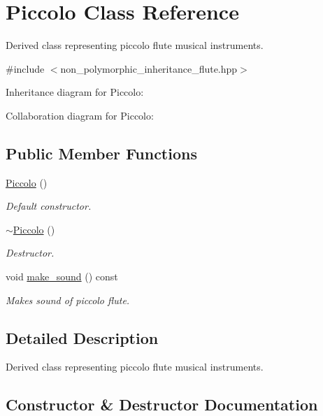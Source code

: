 \hypertarget{classPiccolo}{}\section{Piccolo Class Reference}
\label{classPiccolo}


Derived class representing piccolo flute musical instruments.  




{\ttfamily \#include $<$non\+\_\+polymorphic\+\_\+inheritance\+\_\+flute.\+hpp$>$}



Inheritance diagram for Piccolo\+:


Collaboration diagram for Piccolo\+:
\subsection*{Public Member Functions}
\begin{DoxyCompactItemize}
\item 
\hyperlink{classPiccolo_ac283d73a2d52e99a079de9952a5124f3}{Piccolo} ()
\begin{DoxyCompactList}\small\item\em Default constructor. \end{DoxyCompactList}\item 
\hyperlink{classPiccolo_a6375aaeac11c9801e424498f391d5294}{$\sim$\+Piccolo} ()
\begin{DoxyCompactList}\small\item\em Destructor. \end{DoxyCompactList}\item 
void \hyperlink{classPiccolo_a80fa3e26fe2f9a192dba243a71cf6b1f}{make\+\_\+sound} () const 
\begin{DoxyCompactList}\small\item\em Makes sound of piccolo flute. \end{DoxyCompactList}\end{DoxyCompactItemize}


\subsection{Detailed Description}
Derived class representing piccolo flute musical instruments. 

\subsection{Constructor \& Destructor Documentation}
